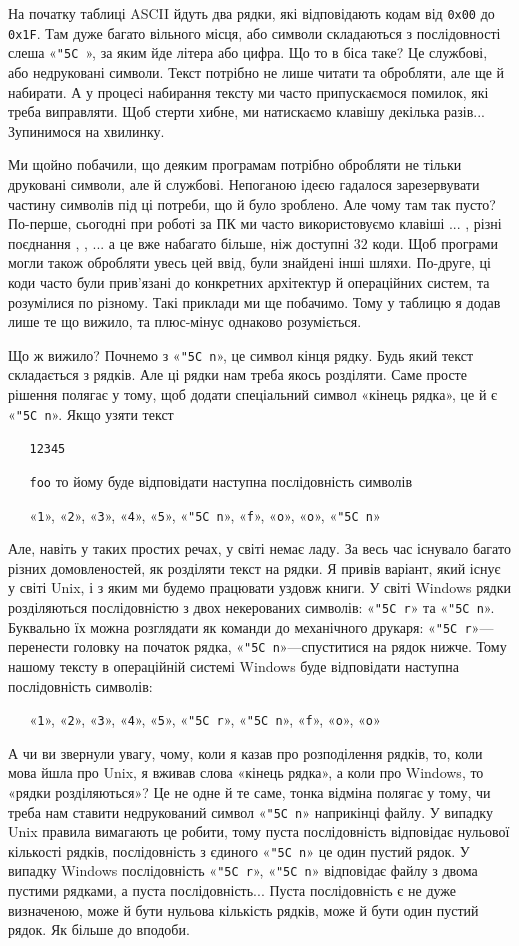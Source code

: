 \documentclass{book}
\newcommand{\hexstr}[1]{{\tt 0x#1}}
\newcommand{\escape}[1]{\texttt{\char"5C #1}}
\newcommand{\textseq}[1]{\par\vbox{\texttt{~~~}#1}}
\newcommand{\chr}[1]{«\texttt{#1}»}
\newcommand{\chesc}[1]{\chr{\escape{#1}}}
\begin{document}
На початку таблиці ASCII йдуть два рядки, які відповідають кодам від \hexstr{00} до \hexstr{1F}.
Там дуже багато вільного місця, або символи складаються з послідовності слеша \chesc{}, за яким йде літера або цифра.
Що то в біса таке?
Це службові, або недруковані символи.
Текст потрібно не лише читати та обробляти, але ще й набирати.
А у процесі набирання тексту ми часто припускаємося помилок, які треба виправляти.
Щоб стерти хибне,  ми натискаємо клавішу \keys{\backspace} декілька разів...
Зупинимося на хвилинку.

Ми щойно побачили, що деяким програмам потрібно обробляти не тільки друковані символи, але й службові.
Непоганою ідеєю гадалося зарезервувати частину символів під ці потреби, що й було зроблено.
Але чому там так пусто?
По-перше, сьогодні при роботі за ПК ми часто використовуємо клавіші  ... , різні поєднання , , ... а це вже набагато більше, ніж доступні $32$ коди.
Щоб програми могли також обробляти увесь цей ввід, були знайдені інші шляхи.
По-друге, ці коди часто були прив'язані до конкретних архітектур й операційних систем, та розумілися по різному.
Такі приклади ми ще побачимо.
Тому у таблицю я додав лише те що вижило, та плюс-мінус однаково розуміється.

Що ж вижило?
Почнемо з \chesc n, це символ кінця рядку.
Будь який текст складається з рядків.
Але ці рядки нам треба якось розділяти.
Саме просте рішення полягає у тому, щоб додати спеціальний символ «кінець рядка», це й є \chesc n.
Якщо узяти текст
\textseq{\texttt{12345}}
\textseq{\texttt{foo}}
\noindent то йому буде відповідати наступна послідовність символів
\textseq{\chr1, \chr2, \chr3, \chr4, \chr5, \chesc n, \chr f, \chr o, \chr o, \chesc n}

Але, навіть у таких простих речах, у світі немає ладу.
За весь час існувало багато різних домовленостей, як розділяти текст на рядки.
Я привів варіант, який існує у світі Unix, і з яким ми будемо працювати уздовж книги.
У світі Windows рядки розділяються послідовністю з двох некерованих символів: \chesc r та \chesc n.
Буквально їх можна розглядати як команди до механічного друкаря: \chesc r---перенести головку на початок рядка, \chesc n---спуститися на рядок нижче.
Тому нашому тексту в операційній системі Windows буде відповідати наступна послідовність символів:
\textseq{\chr1, \chr2, \chr3, \chr4, \chr5, \chesc r, \chesc n, \chr f, \chr o, \chr o}

А чи ви звернули увагу, чому, коли я казав про розподілення рядків, то, коли мова йшла про Unix, я вживав слова «кінець рядка», а коли про Windows, то «рядки розділяються»?
Це не одне й те саме, тонка відміна полягає у тому, чи треба нам ставити недрукований символ \chesc n наприкінці файлу.
У випадку Unix правила вимагають це робити, тому пуста послідовність відповідає нульової кількості рядків, послідовність з єдиного \chesc n це один пустий рядок.
У випадку Windows послідовність \chesc r, \chesc n відповідає файлу з двома пустими рядками, а пуста послідовність...
Пуста послідовність є не дуже визначеною, може й бути нульова кількість рядків, може й бути один пустий рядок.
Як більше до вподоби.
\end{document}
